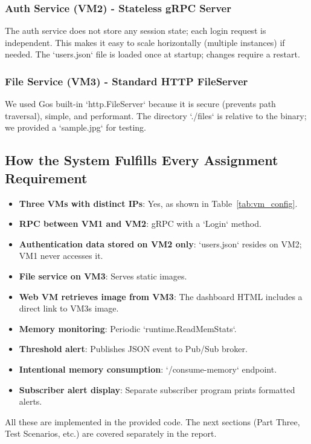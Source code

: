 \documentclass[a4paper]{article}
\begin{document}
\subsubsection{Auth Service (VM2) - Stateless gRPC Server}
The auth service does not store any session state; each login request is independent. This makes it easy to scale horizontally (multiple instances) if needed. The `users.json` file is loaded once at startup; changes require a restart.

\subsubsection{File Service (VM3) - Standard HTTP FileServer}
We used Gos built-in `http.FileServer` because it is secure (prevents path traversal), simple, and performant. The directory `./files` is relative to the binary; we provided a `sample.jpg` for testing.

\subsection{How the System Fulfills Every Assignment Requirement}
\begin{itemize}
    \item \textbf{Three VMs with distinct IPs}: Yes, as shown in Table~\ref{tab:vm_config}.
    \item \textbf{RPC between VM1 and VM2}: gRPC with a `Login` method.
    \item \textbf{Authentication data stored on VM2 only}: `users.json` resides on VM2; VM1 never accesses it.
    \item \textbf{File service on VM3}: Serves static images.
    \item \textbf{Web VM retrieves image from VM3}: The dashboard HTML includes a direct link to VM3s image.
    \item \textbf{Memory monitoring}: Periodic `runtime.ReadMemStats`.
    \item \textbf{Threshold alert}: Publishes JSON event to Pub/Sub broker.
    \item \textbf{Intentional memory consumption}: `/consume-memory` endpoint.
    \item \textbf{Subscriber alert display}: Separate subscriber program prints formatted alerts.
\end{itemize}

All these are implemented in the provided code. The next sections (Part Three, Test Scenarios, etc.) are covered separately in the report.
\end{document}
